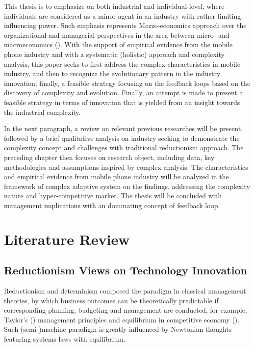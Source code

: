 \documentclass[utf8,english]{gradu3}
\begin{document}
This thesis is to emphasize on both industrial and individual-level, where individuals are considered as a minor agent in an industry with rather limiting influencing power. Such emphasis represents Mezzo-economics approach over the organizational and managerial perspectives in the area between micro- and macroeconomics (\cite{kozuharov2011mezzo}). With the support of empirical evidence from the mobile phone industry and with a systematic (holistic) approach and complexity analysis, this paper seeks to first address the complex characteristics in mobile industry, and then to recognize the evolutionary pattern in the industry innovation; finally, a feasible strategy focusing on the feedback loops based on the discovery of complexity and evolution. Finally, an attempt is made to present a feasible strategy in terms of innovation that is yielded from an insight towards the industrial complexity. 

In the next paragraph, a review on relevant previous researches will be present, followed by a brief qualitative analysis on industry seeking to demonstrate the complexity concept and challenges with traditional reductionism approach. The preceding chapter then focuses on research object, including data, key methodologies and assumptions inspired by complex analysis. The characteristics and empirical evidence from mobile phone industry will be analyzed in the framework of complex adaptive system on the findings, addressing the complexity nature and hyper-competitive market. The thesis will be concluded with management implications with an dominating concept of feedback loop.

\chapter{Literature Review}

\section{Reductionism Views on Technology Innovation}

Reductionism and determinism composed the paradigm in classical management theories, by which business outcomes can be theoretically predictable if corresponding planning, budgeting and management are conducted, for example, Taylor's (\citeyear{taylor1911shop}) management principles and equilibrium in competitive economy (\cite{arrow1954existence}). Such (semi-)machine paradigm is greatly influenced by Newtonian thoughts featuring systems laws with equilibrium.
\end{document}

